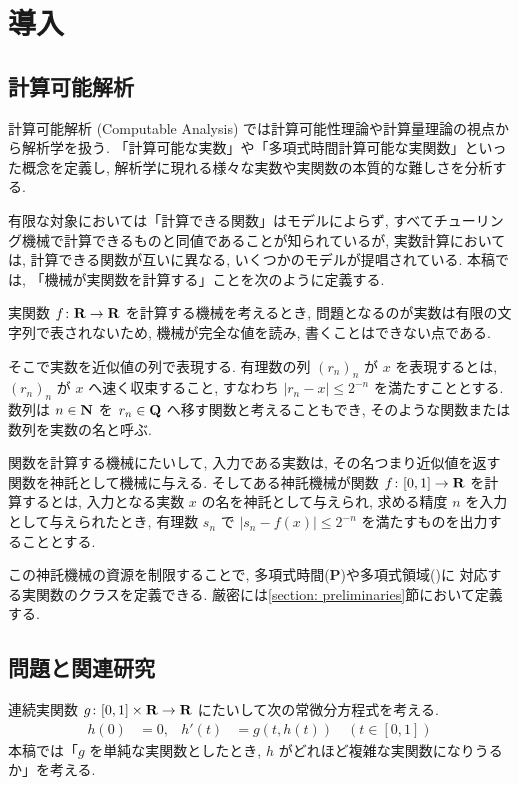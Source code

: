 \section{導入}

\subsection{計算可能解析}

計算可能解析 (Computable Analysis) では計算可能性理論や計算量理論の視点から解析学を扱う. 
「計算可能な実数」や「多項式時間計算可能な実関数」といった概念を定義し, 
解析学に現れる様々な実数や実関数の本質的な難しさを分析する. 

有限な対象においては「計算できる関数」はモデルによらず,
すべてチューリング機械で計算できるものと同値であることが知られているが,
実数計算においては, 計算できる関数が互いに異なる, いくつかのモデルが提唱されている.
本稿では,
「機械が実関数を計算する」ことを次のように定義する.

実関数 $f \colon \mathbf R \to \mathbf R$ を計算する機械を考えるとき,
問題となるのが実数は有限の文字列で表されないため,
機械が完全な値を読み, 書くことはできない点である.

そこで実数を近似値の列で表現する.
有理数の列 $(r_n)_n$ が $x$ を表現するとは,
$(r_n)_n$ が $x$ へ速く収束すること, 
すなわち $|r_n - x| \le 2^{-n}$ を満たすこととする.
数列は $n \in \mathbf N$ を $r_n \in \mathbf Q$ へ移す関数と考えることもでき,
そのような関数または数列を実数の名と呼ぶ.

関数を計算する機械にたいして,
入力である実数は, その名つまり近似値を返す関数を神託として機械に与える.
そしてある神託機械が関数 $f \colon [0, 1] \to \mathbf R$ を計算するとは,
入力となる実数 $x$ の名を神託として与えられ,
求める精度 $n$ を入力として与えられたとき,
有理数 $s_n$ で $|s_n - f(x)| \le 2^{-n}$ を満たすものを出力することとする.

この神託機械の資源を制限することで, 多項式時間({\bf P})や多項式領域(\PSPACE)に
対応する実関数のクラスを定義できる.
厳密には\ref{section: preliminaries}節において定義する.

\subsection{問題と関連研究}

連続実関数 $g \colon [0,1] \times \mathbf R \to \mathbf R$ にたいして次の常微分方程式を考える. 
\begin{align}
 \label{eq:ode}
 h(0) & = 0, &
 h'(t) & = g(t,h(t)) \quad (t \in [0,1])
\end{align}
本稿では「$g$ を単純な実関数としたとき, 
$h$ がどれほど複雑な実関数になりうるか」を考える.

